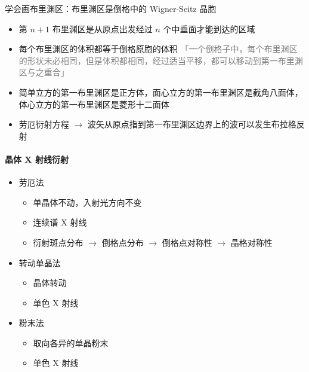 学会画布里渊区：布里渊区是倒格中的 Wigner-Seitz 晶胞

\begin{itemize}
    \item 第 $n + 1$ 布里渊区是从原点出发经过 $n$ 个中垂面才能到达的区域
    \item 每个布里渊区的体积都等于倒格原胞的体积 \textcolor{gray}{「一个倒格子中，每个布里渊区的形状未必相同，但是体积都相同，经过适当平移，都可以移动到第一布里渊区与之重合」}
    \item 简单立方的第一布里渊区是正方体，面心立方的第一布里渊区是截角八面体，体心立方的第一布里渊区是菱形十二面体
    \item 劳厄衍射方程 $\to$ 波矢从原点指到第一布里渊区边界上的波可以发生布拉格反射
\end{itemize}


\paragraph{晶体 X 射线衍射}
\begin{itemize}
    \item 劳厄法 \begin{itemize}
              \item 单晶体不动，入射光方向不变
              \item 连续谱 X 射线
              \item 衍射斑点分布 $\rightarrow$ 倒格点分布 $\rightarrow$ 倒格点对称性 $\rightarrow$ 晶格对称性
          \end{itemize}
    \item 转动单晶法 \begin{itemize}
              \item 晶体转动
              \item 单色 X 射线
          \end{itemize}
    \item 粉末法 \begin{itemize}
              \item 取向各异的单晶粉末
              \item 单色 X 射线
          \end{itemize}
\end{itemize}
{\color{gray}{
    作业里「X 射线衍射可以确定晶体的晶格常数和结构，但无法确定组成元素」这句话是错误的，尽管我还不知道为什么错了
}}


